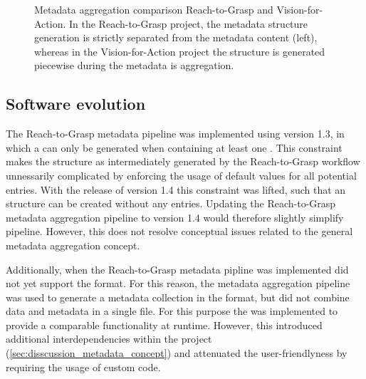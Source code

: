 \begin{figure}
 \centering
 
 \caption[Metadata aggregation comparison Reach-to-Grasp and Vision-for-Action]{Metadata aggregation comparison Reach-to-Grasp and Vision-for-Action. In the Reach-to-Grasp project, the metadata structure generation is strictly separated from the metadata content (left), whereas in the Vision-for-Action project the structure is generated  piecewise during the metadata is aggregation.  }
 \label{fig:discussion_comparison_r2g_v4a}
\end{figure}

\subsection{Software evolution}
The Reach-to-Grasp metadata pipeline was implemented using  version 1.3, in which a   can only be generated when containing at least one . This constraint makes the  structure as intermediately generated by the Reach-to-Grasp workflow unnessarily complicated by enforcing the usage of default values for all potential  entries. With the release of  version 1.4 this constraint was lifted, such that an  structure can be created without any  entries. Updating the Reach-to-Grasp metadata aggregation pipeline to  version 1.4 would therefore slightly simplify pipeline. However, this does not resolve conceptual issues related to the general metadata aggregation concept.

Additionally, when the Reach-to-Grasp metadata pipline was implemented  did not yet support the  format. For this reason, the metadata aggregation pipeline was used to generate a metadata collection in the  format, but did not combine data and metadata in a single file. For this purpose the  was implemented to provide a comparable functionality at runtime. However, this introduced additional interdependencies within the project (\cref{sec:disscussion_metadata_concept}) and attenuated the user-friendlyness by requiring the usage of custom code.


